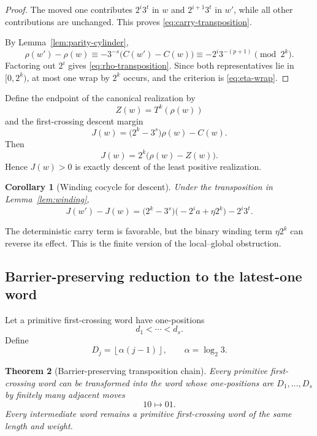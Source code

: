 \documentclass[11pt,reqno]{amsart}
\numberwithin{equation}{section}
\newtheorem{theorem}{Theorem}[section]
\newtheorem{corollary}[theorem]{Corollary}
\theoremstyle{definition}
\theoremstyle{remark}
\newcommand{\floor}[1]{\left\lfloor #1\right\rfloor}
\begin{document}
\begin{proof}
The moved one contributes $2^i3^t$ in $w$ and $2^{i+1}3^t$ in $w'$, while
all other contributions are unchanged.  This proves
\eqref{eq:carry-transposition}.

By Lemma~\ref{lem:parity-cylinder},
\[
\rho(w')-\rho(w)
\equiv
-3^{-s}\bigl(C(w')-C(w)\bigr)
\equiv
-2^i3^{-(p+1)}
\pmod{2^k}.
\]
Factoring out $2^i$ gives \eqref{eq:rho-transposition}.  Since both
representatives lie in $[0,2^k)$, at most one wrap by $2^k$ occurs, and the
criterion is \eqref{eq:eta-wrap}.
\end{proof}

Define the endpoint of the canonical realization by
\[
Z(w)=T^k(\rho(w))
\]
and the first-crossing descent margin
\begin{equation}\label{eq:J-def}
J(w)=\bigl(2^k-3^s\bigr)\rho(w)-C(w).
\end{equation}
Then
\begin{equation}\label{eq:J-endpoint}
J(w)=2^k\bigl(\rho(w)-Z(w)\bigr).
\end{equation}
Hence $J(w)>0$ is exactly descent of the least positive realization.

\begin{corollary}[Winding cocycle for descent]\label{cor:winding-cocycle}
Under the transposition in Lemma~\ref{lem:winding},
\begin{equation}\label{eq:J-transposition}
J(w')-J(w)
=
\bigl(2^k-3^s\bigr)\bigl(-2^ia+\eta2^k\bigr)
-2^i3^t.
\end{equation}
\end{corollary}

The deterministic carry term is favorable, but the binary winding term
$\eta2^k$ can reverse its effect.  This is the finite version of the
local--global obstruction.

\subsection{Barrier-preserving reduction to the latest-one word}

Let a primitive first-crossing word have one-positions
\[
d_1<\cdots<d_s.
\]
Define
\begin{equation}\label{eq:latest-one-positions}
D_j=\floor{\alpha(j-1)},
\qquad
\alpha=\log_2 3.
\end{equation}

\begin{theorem}[Barrier-preserving transposition chain]\label{thm:mechanical-chain}
Every primitive first-crossing word can be transformed into the word whose
one-positions are $D_1,\ldots,D_s$ by finitely many adjacent moves
\[
10\longmapsto01.
\]
Every intermediate word remains a primitive first-crossing word of the same
length and weight.
\end{theorem}
\end{document}
